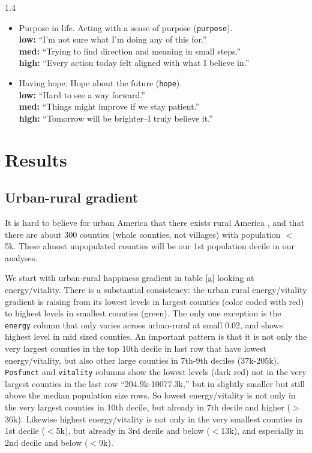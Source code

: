 \documentclass[10pt, letterpaper]{article}
\newcommand{\emd}[1]{\ExecuteMetaData[/tmp/tex]{#1}} %
\begin{document}
\begin{spacing}{1.4}
\begin{itemize}
\item Purpose in life. Acting with a sense of purpose (\texttt{purpose}).\\
\textbf{low:} ``I'm not sure what I'm doing any of this for.'' \\
\textbf{med:} ``Trying to find direction and meaning in small steps.'' \\
\textbf{high:} ``Every action today felt aligned with what I believe in.'' 

\item Having hope. Hope about the future (\texttt{hope}).\\
\textbf{low:} ``Hard to see a way forward.'' \\
\textbf{med:} ``Things might improve if we stay patient.'' \\
\textbf{high:} ``Tomorrow will be brighter--I truly believe it.'' 

\end{itemize}


\section{Results}

\subsection{Urban-rural gradient}

It is hard to believe for urban America that there exists rural America
\citep{hansonCityJournalautumn15}, and that there are about 300 counties
(whole counties, not villages) with population $<$ 5k. These almost unpopulated
counties will be our 1st population decile in our analyses. 



We start with urban-rural happiness gradient \citep{aok11a} in table \ref{a}
looking at energy/vitality. There is a substantial consistency: the urban rural
 energy/vitality gradient is
raising from its lowest levels in largest counties (color coded with red) to
highest levels in smallest counties (green). The only one exception is the
\texttt{energy} column that only varies across urban-rural at small 0.02, and 
shows highest level in mid sized counties.
 An important pattern is that it is not only the very largest counties in the
 top 10th decile in last row that have lowest energy/vitality, but also other
 large counties in 7th-9th deciles (37k-205k).
 \texttt{Posfunct} and \texttt{vitality} columns show the
 lowest levels (dark red) not in the very largest counties in the last row
 ``204.9k-10077.3k,'' but in slightly smaller but still above the median
 population size rows.
 So lowest energy/vitality is
 not only in the very largest counties in 10th decile, but already in 7th decile
 and higher ($>$36k). Likewise highest energy/vitality is not only in the very
 smallest counties in 1st decile ($<$5k), but already in 3rd decile and below
 ($<$13k), and especially in 2nd decile and below ($<$9k). 


\end{spacing}
\end{document}
